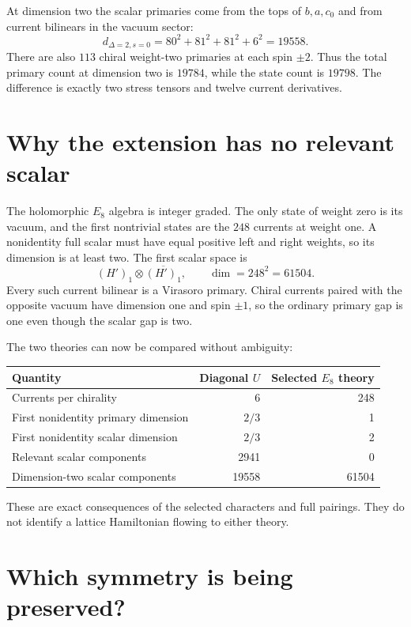 At dimension two the scalar primaries come from the tops of
$b,a,c_0$ and from current bilinears in the vacuum sector:
\begin{equation}
 d_{\Delta=2,s=0}=80^2+81^2+81^2+6^2=19558.
 \label{eq:full-diagonal-dim2}
\end{equation}
There are also $113$ chiral weight-two primaries at each spin
$\pm2$. Thus the total primary count at dimension two is $19784$,
while the state count is $19798$. The difference is exactly two
stress tensors and twelve current derivatives.

\section{Why the extension has no relevant scalar}

The holomorphic $E_8$ algebra is integer graded. The only state of
weight zero is its vacuum, and the first nontrivial states are the
$248$ currents at weight one. A nonidentity full scalar must have
equal positive left and right weights, so its dimension is at
least two. The first scalar space is
\[
 (H')_1\otimes\overline{(H')_1},
 \qquad\dim=248^2=61504.
\]
Every such current bilinear is a Virasoro primary. Chiral currents
paired with the opposite vacuum have dimension one and spin
$\pm1$, so the ordinary primary gap is one even though the scalar
gap is two.

The two theories can now be compared without ambiguity:
\begin{center}
\begin{tabular}{lrr}
\toprule
Quantity&Diagonal $U$&Selected $E_8$ theory\\
\midrule
Currents per chirality&6&248\\
First nonidentity primary dimension&$2/3$&1\\
First nonidentity scalar dimension&$2/3$&2\\
Relevant scalar components&2941&0\\
Dimension-two scalar components&19558&61504\\
\bottomrule
\end{tabular}
\end{center}
These are exact consequences of the selected characters and full
pairings. They do not identify a lattice Hamiltonian flowing to
either theory.

\section{Which symmetry is being preserved?}

